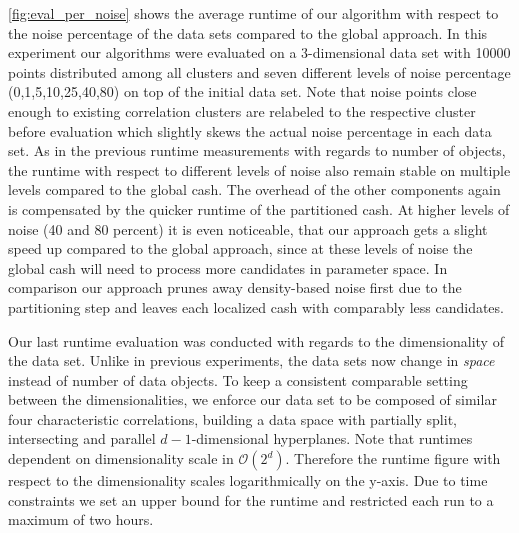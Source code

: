 \autoref{fig:eval_per_noise} shows the average runtime of our algorithm with respect to the noise percentage of the data sets compared to the global approach. In this experiment our algorithms were evaluated on a 3-dimensional data set with 10000 points distributed among all clusters and seven different levels of noise percentage (0,1,5,10,25,40,80) on top of the initial data set. Note that noise points close enough to existing correlation clusters are relabeled to the respective cluster before evaluation which slightly skews the actual noise percentage in each data set.
As in the previous runtime measurements with regards to number of objects, the runtime with respect to different levels of noise also remain stable on multiple levels compared to the global \gls{cash}. The overhead of the other components again is compensated by the quicker runtime of the partitioned \gls{cash}. At higher levels of noise (40 and 80 percent) it is even noticeable, that our approach gets a slight speed up compared to the global approach, since at these levels of noise the global cash will need to process more candidates in parameter space. In comparison our approach prunes away density-based noise first due to the partitioning step and leaves each localized \gls{cash} with comparably less candidates.

Our last runtime evaluation was conducted with regards to the dimensionality of the data set. Unlike in previous experiments, the data sets now change in \textit{space} instead of number of data objects. To keep a consistent comparable setting between the dimensionalities, we enforce our data set to be composed of similar four characteristic correlations, building a data space with partially split, intersecting and parallel $d-1$-dimensional hyperplanes. 
Note that runtimes dependent on dimensionality scale in $\mathcal{O}(2^d)$. Therefore the runtime figure with respect to the dimensionality scales logarithmically on the y-axis. Due to time constraints we set an upper bound for the runtime and restricted each run to a maximum of two hours. 

